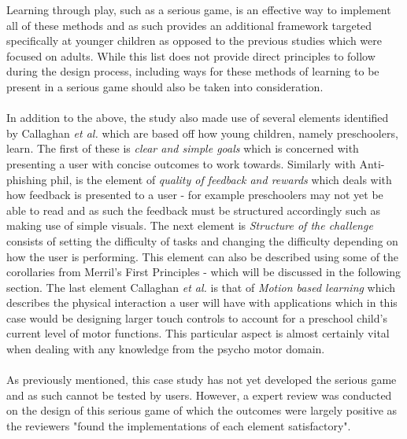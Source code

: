 \documentclass[conference]{IEEEtran}
\begin{document}
Learning through play, such as a serious game, is an effective way to implement all of these methods\cite{allers2021children} and as such provides an additional framework targeted specifically at younger children as opposed to the previous studies\cite{Dincelli2020,Sheng2007} which were focused on adults. While this list does not provide direct principles to follow during the design process, including ways for these methods of learning to be present in a serious game should also be taken into consideration.
\\\\
In addition to the above, the study also made use of several elements identified by Callaghan \textit{et al.}\cite{callaghan2018} which are based off how young children, namely preschoolers, learn. The first of these is \textit{clear and simple goals} which is concerned with presenting a user with concise outcomes to work towards\cite{callaghan2018}. Similarly with Anti-phishing phil\cite{Sheng2007}, is the element of \textit{quality of feedback and rewards} which deals with how feedback is presented to a user - for example preschoolers may not yet be able to read and as such the feedback must be structured accordingly such as making use of simple visuals\cite{allers2021children}. The next element is \textit{Structure of the challenge} consists of setting the difficulty of tasks and changing the difficulty depending on how the user is performing\cite{callaghan2018}. This element can also be described using some of the corollaries from Merril's First Principles\cite{Merrill2002} - which will be discussed in the following section. The last element Callaghan \textit{et al.}\cite{callaghan2018} is that of \textit{Motion based learning} which describes the physical interaction a user will have with applications which in this case would be designing larger touch controls to account for a preschool child's current level of motor functions. This particular aspect is almost certainly vital when dealing with any knowledge from the psycho motor domain.
\\\\
As previously mentioned, this case study has not yet developed the serious game and as such cannot be tested by users. However, a expert review was conducted on the design of this serious game of which the outcomes were largely positive as the reviewers "found the implementations of each element satisfactory"\cite{allers2021children}.
\end{document}
